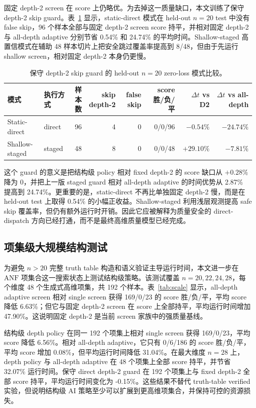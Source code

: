 \documentclass[UTF8,fontset=macnew,11pt]{ctexart}
\newcommand{\anf}{\ensuremath{\mathrm{ANF}}}
\begin{document}
固定 depth-2 screen 在 score 上仍略优。为去掉这一质量缺口，本文训练了保守 depth-2 skip guard。表~\ref{tab:guard} 显示，static-direct 模式在 held-out $n=20$ test 中没有 false skip，96 个样本全部与固定 depth-2 screen score 持平，并相对固定 depth-2 与 all-depth adaptive 分别节省 0.54\% 和 24.74\% 的平均时间。Shallow-staged 高置信模式在辅助 48 样本切片上把安全跳过覆盖率提高到 8/48，但由于先运行 shallow screen，相对固定 depth-2 本身仍更慢。

\begin{table}[t]
\centering
\scriptsize
\caption{保守 depth-2 skip guard 的 held-out $n=20$ zero-loss 模式比较。}
\label{tab:guard}
\begin{tabular}{llrrrrrr}
\toprule
模式 & 执行方式 & 样本数 & skip depth-2 & false skip & score 胜/负/平 & $\Delta t$ vs D2 & $\Delta t$ vs all-depth \\
\midrule
Static-direct & direct & 96 & 4 & 0 & 0/0/96 & $-0.54\%$ & $-24.74\%$ \\
Shallow-staged & staged & 48 & 8 & 0 & 0/0/48 & $+29.10\%$ & $-7.81\%$ \\
\bottomrule
\end{tabular}
\end{table}

这个 guard 的意义是把结构级 policy 相对 fixed depth-2 的 score 缺口从 $+0.28\%$ 降为 $0$，并把上一版 staged guard 相对 all-depth adaptive 的时间优势从 2.87\% 提高到 24.74\%。更重要的是，static-direct 不再比单独固定 depth-2 慢，而是在 held-out test 上取得 0.54\% 的小幅正收益。Shallow-staged 利用浅层观测提高 safe skip 覆盖率，但仍有额外运行时开销。因此它应被解释为质量安全的 direct-dispatch 方向已经打通，而不是最终高维质量模型已经完成。

\subsection{项集级大规模结构测试}

为避免 $n>20$ 完整 truth table 构造和语义验证主导运行时间，本文进一步在 \anf{} 项集合这一搜索状态上测试结构级策略。该测试覆盖 $n=20,22,24,28$，每个维度 48 个生成式高维项集，共 192 个样本。表~\ref{tab:scale} 显示，all-depth adaptive screen 相对 single screen 获得 169/0/23 的 score 胜/负/平，平均 score 降低 6.63\%；但它与固定 depth-2 screen 在 score 上全部持平，平均运行时间增加 47.90\%。这说明固定 depth-2 是当前 screen 家族中的强质量基线。

结构级 depth policy 在同一 192 个项集上相对 single screen 获得 169/0/23，平均 score 降低 6.56\%。相对 all-depth adaptive，它只有 0/6/186 的 score 胜/负/平，平均 score 增加 0.08\%，但平均运行时间降低 31.04\%。在最大维度 $n=28$ 上，depth policy 与 all-depth adaptive 在 48 个项集上全部 score 持平，并节省 32.07\% 运行时间。保守 direct depth-2 guard 在 192 个项集上与 fixed depth-2 全部 score 持平，平均运行时间变化为 -0.15\%。这些结果不替代 truth-table verified 实验，但说明结构级 AI 策略至少可以扩展到更高维项集合，并保持可控的资源损失。
\end{document}
